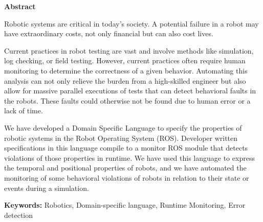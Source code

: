 \vspace*{2cm}
\begin{center}
\Large \bf Abstract
\end{center}
\vspace*{1cm} \setlength{\baselineskip}{0.6cm}

Robotic systems are critical in today's society. A potential failure in a robot may have extraordinary costs, not only financial but can also cost lives.

Current practices in robot testing are vast and involve methods like simulation, log checking, or field testing. However, current practices often require human monitoring to determine the correctness of a given behavior. Automating this analysis can not only relieve the burden from a high-skilled engineer but also allow for massive parallel executions of tests that can detect behavioral faults in the robots. These faults could otherwise not be found due to human error or a lack of time.
    
We have developed a Domain Specific Language to specify the properties of robotic systems in the Robot Operating System (ROS). Developer written specifications in this language compile to a monitor ROS module that detects violations of those properties in runtime. We have used this language to express the temporal and positional properties of robots, and we have automated the monitoring of some behavioral violations of robots in relation to their state or events during a simulation.

\vfill

\begin{flushleft}
\textbf{Keywords:}
Robotics, Domain-specific language, Runtime Monitoring, Error detection
\end{flushleft}
